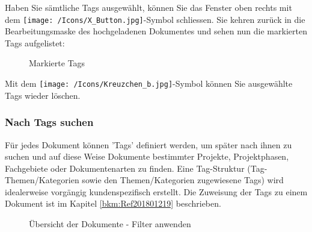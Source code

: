 Haben Sie sämtliche Tags ausgewählt, können Sie das Fenster oben rechts mit dem \texttt{[image: /Icons/X\_Button.jpg]}-Symbol  schliessen. Sie kehren zurück in die Bearbeitungsmaske des hochgeladenen Dokumentes und sehen nun die markierten Tags aufgelistet:

\begin{figure}[H]
\caption{Markierte Tags}
\end{figure}

Mit dem \texttt{[image: /Icons/Kreuzchen\_b.jpg]}-Symbol  können Sie ausgewählte Tags wieder löschen.
 
\subsubsection{Nach Tags suchen}
\label{bkm:Ref442275849}

Für jedes Dokument können 'Tags' definiert werden, um später nach ihnen zu suchen und auf diese Weise Dokumente bestimmter Projekte, Projektphasen, Fachgebiete oder Dokumentenarten zu finden. Eine Tag-Struktur (Tag-Themen/Kategorien sowie den Themen/Kategorien zugewiesene Tags) wird idealerweise vorgängig kundenspezifisch erstellt. Die Zuweisung der Tags zu einem Dokument ist im Kapitel \ref{bkm:Ref201801219} beschrieben.

\begin{figure}[H]
\caption{Übersicht der Dokumente - Filter anwenden}
\end{figure}

